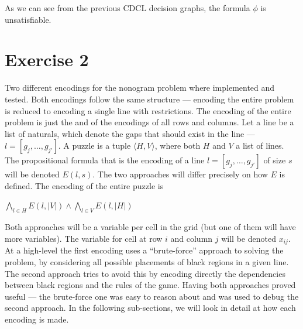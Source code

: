 \documentclass[12pt]{article}
\begin{document}
\vspace{1cm}

As we can see from the previous CDCL decision graphs, the formula $\phi$ is unsatisfiable.

\section*{Exercise 2}


Two different encodings for the nonogram problem where implemented and tested.
Both encodings follow the same structure — encoding the entire problem is reduced to encoding a single line with restrictions.
The encoding of the entire problem is just the and of the encodings of all rows and columns.
Let a line be a list of naturals, which denote the gaps that should exist in the line — $l = [g_j, \ldots, g_{j'}]$.
A puzzle is a tuple $\langle H, V\rangle$, where both $H$ and $V$ a list of lines.
The propositional formula that is the encoding of a line $l = [g_j, \ldots, g_{j'}]$ of size $s$ will be denoted $E(l, s)$.
The two approaches will differ precisely on how $E$ is defined.
The encoding of the entire puzzle is

\begin{center}
  $\bigwedge\limits_{l \in H} E(l, |V|) \wedge \bigwedge\limits_{l \in V} E(l, |H|)$
\end{center}

Both approaches will be a variable per cell in the grid (but one of them will have more variables). The variable for cell at row $i$ and column $j$ will be denoted $x_{ij}$.
At a high-level the first encoding uses a ``brute-force'' approach to solving the problem, by considering all possible placements of black regions in a given line.
The second approach tries to avoid this by encoding directly the dependencies between black regions and the rules of the game.
Having both approaches proved useful — the brute-force one was easy to reason about and was used to debug the second approach.
In the following sub-sections, we will look in detail at how each encoding is made.
\end{document}
